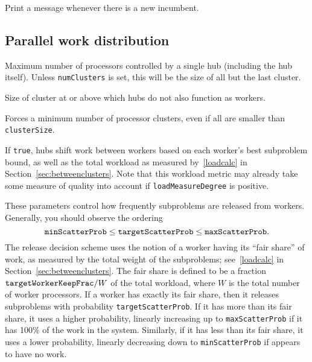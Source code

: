 Print a message whenever there is a new incumbent.

\subsection{Parallel work distribution}
\vspace{-3ex}
Maximum number of processors controlled by a single hub (including the
hub itself).  Unless \texttt{numClusters} is set, this will be the
size of all but the last cluster.

Size of cluster at or above which hubs do not also function as workers.
 
Forces a minimum number of processor clusters, even if all are smaller than
\texttt{clusterSize}. 

If \texttt{true}, hubs shift work between workers based on each
worker's best subproblem bound,
as well as the total workload as measured by~\eqref{loadcalc} in
Section~\ref{sec:betweenclusters}.  Note that this workload metric
may already take some measure of quality into account if
\texttt{loadMeasureDegree} is positive.

\groupparams
{}
\groupparams
{}
\groupparams
{}
These parameters control how frequently subproblems are released from
workers.  Generally, you should observe the ordering
$$
\text{\texttt{minScatterProb}} \leq
\text{\texttt{targetScatterProb}} \leq
\text{\texttt{maxScatterProb}}.
$$ 
The release decision scheme uses the notion of a worker having its
``fair share'' of work, as measured by the total weight of the
subproblems; see~\eqref{loadcalc} in
Section~\ref{sec:betweenclusters}.  The fair share is defined to be a
fraction $\text{\texttt{targetWorkerKeepFrac}}/W$ of the total
workload, where $W$ is the total number of worker processors.  If a
worker has exactly its fair share, then it releases subproblems with
probability \texttt{targetScatterProb}.  If it has more than its fair
share, it uses a higher probability, linearly increasing up to
\texttt{maxScatterProb} if it has 100\% of the work in the system.
Similarly, if it has less than its fair share, it uses a lower
probability, linearly decreasing down to \texttt{minScatterProb} if
appears to have no work.

